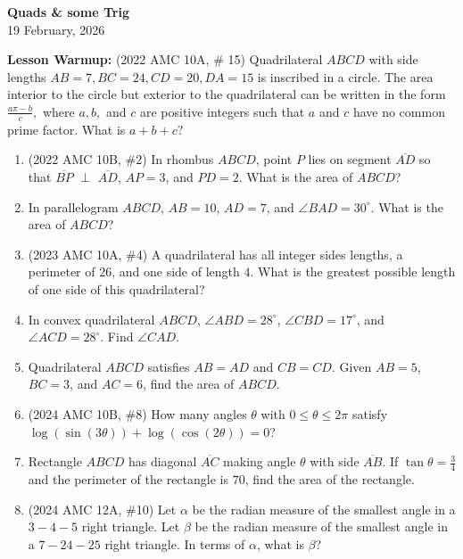 \documentclass[a4paper]{article}
\begin{document}
\begin{center}
{\Large\bfseries Quads \& some Trig}\\[0.25cm]
{\large 19 February, 2026}\\[1cm]
\end{center}

\noindent \textbf{Lesson Warmup:} (2022 AMC 10A, \# 15) Quadrilateral $ABCD$ with side lengths $AB=7, BC=24, CD=20, DA=15$ is inscribed in a circle. The area interior to the circle but exterior to the quadrilateral can be written in the form $\frac{a\pi-b}{c},$ where $a,b,$ and $c$ are positive integers such that $a$ and $c$ have no common prime factor. What is $a+b+c?$

\vspace{8em}

\begin{enumerate}[itemsep=2.5cm]
    \item (2022 AMC 10B, \#2) In rhombus $ABCD$, point $P$ lies on segment $\overline{AD}$ so that $\overline{BP}$ $\perp$ $\overline{AD}$, $AP = 3$, and $PD = 2$. What is the area of $ABCD$?

    \item In parallelogram $ABCD$, $AB=10$, $AD=7$, and $\angle BAD=30^\circ$. What is the area of $ABCD$?

    \item (2023 AMC 10A, \#4) A quadrilateral has all integer sides lengths, a perimeter of $26$, and one side of length $4$. What is the greatest possible length of one side of this quadrilateral?


    \item In convex quadrilateral $ABCD$, $\angle ABD=28^\circ$, $\angle CBD=17^\circ$, and $\angle ACD=28^\circ$.
    Find $\angle CAD$.

    \item Quadrilateral $ABCD$ satisfies $AB=AD$ and $CB=CD$.
    Given $AB=5$, $BC=3$, and $AC=6$, find the area of $ABCD$.

    \item (2024 AMC 10B, \#8) How many angles $\theta$ with $0\le\theta\le2\pi$ satisfy $\log(\sin(3\theta))+\log(\cos(2\theta))=0$? 

    \item Rectangle $ABCD$ has diagonal $\overline{AC}$ making angle $\theta$ with side $\overline{AB}$. If $\tan\theta=\frac34$ and the perimeter of the rectangle is $70$, find the area of the rectangle.

    \item (2024 AMC 12A, \#10) Let $\alpha$ be the radian measure of the smallest angle in a $3{-}4{-}5$ right triangle. Let $\beta$ be the radian measure of the smallest angle in a $7{-}24{-}25$ right triangle. In terms of $\alpha$, what is $\beta$? 


\end{enumerate}
\end{document}
